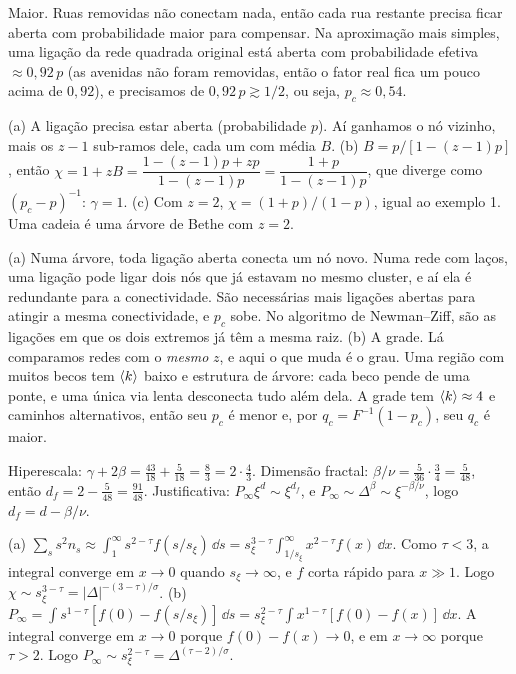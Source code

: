 \documentclass[11pt]{article}
\begin{document}
Maior. Ruas removidas não conectam nada, então cada rua restante precisa ficar aberta com probabilidade maior para compensar. Na aproximação mais simples, uma ligação da rede quadrada original está aberta com probabilidade efetiva $\approx 0{,}92\,p$ (as avenidas não foram removidas, então o fator real fica um pouco acima de $0{,}92$), e precisamos de $0{,}92\,p\gtrsim 1/2$, ou seja, $p_c\approx 0{,}54$.

(a) A ligação precisa estar aberta (probabilidade $p$). Aí ganhamos o nó vizinho, mais os $z-1$ sub-ramos dele, cada um com média $B$. (b) $B = p/[1-(z-1)p]$, então $\chi = 1+zB = \dfrac{1-(z-1)p+zp}{1-(z-1)p} = \dfrac{1+p}{1-(z-1)p}$, que diverge como $(p_c-p)^{-1}$: $\gamma=1$. (c) Com $z=2$, $\chi=(1+p)/(1-p)$, igual ao exemplo 1. Uma cadeia é uma árvore de Bethe com $z=2$.

(a) Numa árvore, toda ligação aberta conecta um nó novo. Numa rede com laços, uma ligação pode ligar dois nós que já estavam no mesmo cluster, e aí ela é redundante para a conectividade. São necessárias mais ligações abertas para atingir a mesma conectividade, e $p_c$ sobe. No algoritmo de Newman--Ziff, são as ligações em que os dois extremos já têm a mesma raiz. (b) A grade. Lá comparamos redes com o \emph{mesmo} $z$, e aqui o que muda é o grau. Uma região com muitos becos tem $\left\langle k \right\rangle$ baixo e estrutura de árvore: cada beco pende de uma ponte, e uma única via lenta desconecta tudo além dela. A grade tem $\left\langle k \right\rangle\approx4$ e caminhos alternativos, então seu $p_c$ é menor e, por $q_c=F^{-1}(1-p_c)$, seu $q_c$ é maior.

Hiperescala: $\gamma+2\beta = \tfrac{43}{18}+\tfrac{5}{18} = \tfrac83 = 2\cdot\tfrac43$. Dimensão fractal: $\beta/\nu = \tfrac{5}{36}\cdot\tfrac34 = \tfrac5{48}$, então $d_f = 2-\tfrac5{48} = \tfrac{91}{48}$. Justificativa: $P_\infty\xi^d\sim\xi^{d_f}$, e $P_\infty\sim\Delta^\beta\sim\xi^{-\beta/\nu}$, logo $d_f = d-\beta/\nu$.

(a) $\sum_s s^2 n_s \approx \int_1^\infty s^{2-\tau} f(s/s_\xi)\,\dd s = s_\xi^{3-\tau}\int_{1/s_\xi}^\infty x^{2-\tau}f(x)\,\dd x$. Como $\tau<3$, a integral converge em $x\to0$ quando $s_\xi\to\infty$, e $f$ corta rápido para $x\gg1$. Logo $\chi\sim s_\xi^{3-\tau} = |\Delta|^{-(3-\tau)/\sigma}$. (b) $P_\infty = \int s^{1-\tau}[f(0)-f(s/s_\xi)]\,\dd s = s_\xi^{2-\tau}\int x^{1-\tau}[f(0)-f(x)]\,\dd x$. A integral converge em $x\to0$ porque $f(0)-f(x)\to0$, e em $x\to\infty$ porque $\tau>2$. Logo $P_\infty\sim s_\xi^{2-\tau} = \Delta^{(\tau-2)/\sigma}$.
\end{document}
